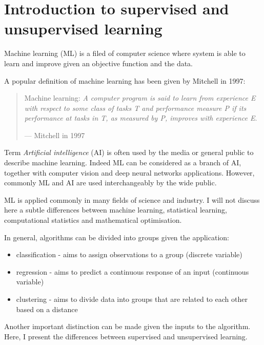 \documentclass[12pt,]{book}
\providecommand{\tightlist}{%
  \setlength{\itemsep}{0pt}\setlength{\parskip}{0pt}}
\theoremstyle{definition}
\theoremstyle{definition}
\theoremstyle{definition}
\theoremstyle{remark}
\begin{document}
\hypertarget{introduction-to-supervised-and-unsupervised-learning}{%
\section{Introduction to supervised and unsupervised
learning}\label{introduction-to-supervised-and-unsupervised-learning}}

Machine learning (ML) is a filed of computer science where system is
able to learn and improve given an objective function and the data.

A popular definition of machine learning has been given by Mitchell in
1997:

\begin{quote}
Machine learning: \emph{A computer program is said to learn from
experience E with respect to some class of tasks T and performance
measure P if its performance at tasks in T, as measured by P, improves
with experience E}.

--- Mitchell in 1997 \citep{Mitchell1997}
\end{quote}

Term \emph{Artificial intelligence} (AI) is often used by the media or
general public to describe machine learning. Indeed ML can be considered
as a branch of AI, together with computer vision and deep neural
networks applications. However, commonly ML and AI are used
interchangeably by the wide public.

ML is applied commonly in many fields of science and industry. I will
not discuss here a subtle differences between machine learning,
statistical learning, computational statistics and mathematical
optimisation.

In general, algorithms can be divided into groups given the application:

\begin{itemize}
\tightlist
\item
  classification - aims to assign observations to a group (discrete
  variable)
\item
  regression - aims to predict a continuous response of an input
  (continuous variable)
\item
  clustering - aims to divide data into groups that are related to each
  other based on a distance
\end{itemize}

Another important distinction can be made given the inputs to the
algorithm. Here, I present the differences between supervised and
unsupervised learning.
\end{document}
